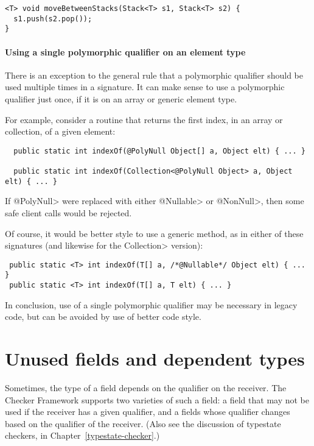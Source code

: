 \begin{Verbatim}
<T> void moveBetweenStacks(Stack<T> s1, Stack<T> s2) {
  s1.push(s2.pop());
}
\end{Verbatim}




\paragraph{Using a single polymorphic qualifier on an element type\label{qualifier-polymorphism-element-types}}

There is an exception to the general rule that a polymorphic qualifier
should be used multiple times in a signature.  It can make sense to use a
polymorphic qualifier just once, if it is on an array or generic element
type.

For example, consider a routine that returns the first index, in an array
or collection, of a given element:

\begin{Verbatim}
  public static int indexOf(@PolyNull Object[] a, Object elt) { ... }

  public static int indexOf(Collection<@PolyNull Object> a, Object elt) { ... }
\end{Verbatim}

If \<@PolyNull> were replaced with either \<@Nullable> or \<@NonNull>, then
some safe client calls would be rejected.

Of course, it would be better style to use a generic method, as in either
of these signatures (and likewise for the \<Collection> version):

\begin{Verbatim}
 public static <T> int indexOf(T[] a, /*@Nullable*/ Object elt) { ... }
 public static <T> int indexOf(T[] a, T elt) { ... }
\end{Verbatim}

In conclusion, use of a single polymorphic qualifier may be necessary in
legacy code, but can be avoided by use of better code style.


\section{Unused fields and dependent types\label{unused-fields-and-dependent-types}}

Sometimes, the type of a field depends on the qualifier on the receiver.
The Checker Framework supports two varieties of such a field:  a field that
may not be used if the receiver has a given qualifier, and a fields whose
qualifier changes based on the qualifier of the receiver.
(Also see the discussion of typestate checkers, in
Chapter~\ref{typestate-checker}.)


